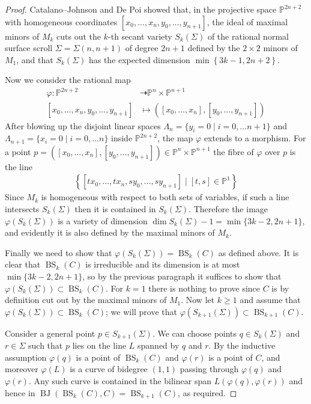 \documentclass[a4paper,11pt]{article}
\newcommand{\PP}{\mathbb P}
\newcommand{\BJ}{\operatorname{BJ}}
\newcommand{\BS}{\operatorname{BS}}
\newcommand{\ourproduct}{\mathbb P^n \times \mathbb P^{n+1}}
\begin{document}
 \begin{proof}
   Catalano--Johnson \cite{CJ96} and De Poi \cite{dP96} showed that, in the projective space $\PP^{2n+2}$ with homogeneous coordinates $[x_0,\ldots,x_n,y_0,\ldots,y_{n+1}]$, the ideal of maximal minors of $M_k$ cuts out the $k$-th secant variety $S_k(\Sigma)$ of the rational normal surface scroll $\Sigma=\Sigma(n,n+1)$ of degree $2n+1$ defined by the $2\times2$ minors of $M_1$, and that $S_k(\Sigma)$ has the expected dimension $\operatorname{min}\left\{3k-1,2n+2 \right\}$.

   Now we consider the rational map
   \begin{align*}
     \varphi \colon \PP^{2n+2} &\dashrightarrow \ourproduct \\
     \left[x_0,\ldots,x_n,y_0,\ldots,y_{n+1} \right] &\mapsto \left(\left[x_0,\ldots,x_n\right],\left[y_0,\ldots,y_{n+1}\right]\right)
   \end{align*}
   After blowing up the disjoint linear spaces $\Lambda_n = \{ y_i =0 \mid i = 0,\ldots n+1\}$ and $\Lambda_{n+1} = \{ x_i =0 \mid i = 0,\ldots n\}$ inside $\PP^{2n+2}$, the map $\varphi$ extends to a morphism. For a point $p=\left(\left[x_0,\ldots,x_n\right],\left[y_0,\ldots,y_{n+1}\right]\right) \in \ourproduct$ the fibre of $\varphi$ over $p$ is the line
   \begin{align*}
    \left\{\left[tx_0,\ldots,tx_n,sy_0,\ldots,sy_{n+1}\right]\mid [t,s] \in \PP^1 \right\}
   \end{align*}
   Since $M_k$ is homogeneous with respect to both sets of variables, if such a line intersects $S_k(\Sigma)$ then it is contained in $S_k(\Sigma)$. Therefore the image $\varphi(S_k(\Sigma))$ is a variety of dimension $\dim S_k(\Sigma)-1 = \min\{3k-2,2n+1\}$, and evidently it is also defined by the maximal minors of $M_k$.

   Finally we need to show that $\varphi(S_k(\Sigma))=\BS_k(C)$ as defined above. It is clear that $\BS_k(C)$ is irreducible and its dimension is at most $\min\{3k-2,2n+1\}$, so by the previous paragraph it suffices to show that $\varphi(S_k(\Sigma)) \subset \BS_k(C)$. For $k=1$ there is nothing to prove since $C$ is by definition cut out by the maximal minors of $M_1$. Now let $k \geq 1$ and assume that $\varphi(S_k(\Sigma)) \subset \BS_k(C)$; we will prove that $\varphi(S_{k+1}(\Sigma)) \subset \BS_{k+1}(C)$.

   Consider a general point $p \in S_{k+1}(\Sigma)$. We can choose points $q \in S_k(\Sigma)$ and $r \in \Sigma$ such that $p$ lies on the line $L$ spanned by $q$ and $r$. By the inductive assumption $\varphi(q)$ is a point of $\BS_k(C)$ and $\varphi(r)$ is a point of $C$, and moreover $\varphi(L)$ is a curve of bidegree $(1,1)$ passing through $\varphi(q)$ and $\varphi(r)$. Any such curve is contained in the bilinear span $L(\varphi(q),\varphi(r))$ and hence in $\BJ(\BS_k(C),C)=\BS_{k+1}(C)$, as required.
  \end{proof}
\end{document}
